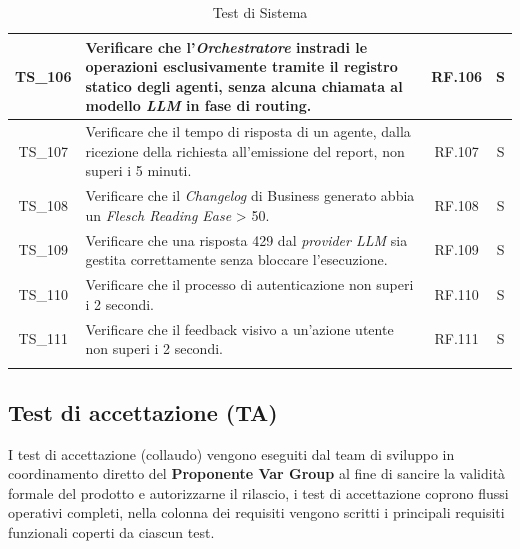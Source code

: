\documentclass[12pt, a4paper]{article}
\newlength{\LargColVal} %
\begin{document}
\begin{xltabular}{\textwidth}{|c|X|C{\LargColVal}|C{\LargColVal}|}
    TS\_106 & Verificare che l'\textit{Orchestratore} instradi le operazioni esclusivamente tramite il registro statico degli agenti, senza alcuna chiamata al modello \textit{LLM} in fase di routing. & RF.106 & S \\ \hline
    TS\_107 & Verificare che il tempo di risposta di un agente, dalla ricezione della richiesta all'emissione del report, non superi i 5 minuti. & RF.107 & S \\ \hline
    TS\_108 & Verificare che il \textit{Changelog} di Business generato abbia un \textit{Flesch Reading Ease} > 50. & RF.108 & S \\ \hline
    TS\_109 & Verificare che una risposta 429 dal \textit{provider LLM} sia gestita correttamente senza bloccare l'esecuzione. & RF.109 & S \\ \hline
    TS\_110 & Verificare che il processo di autenticazione non superi i 2 secondi. & RF.110 & S \\ \hline
    TS\_111 & Verificare che il feedback visivo a un'azione utente non superi i 2 secondi. & RF.111 & S \\ \hline

    \caption{Test di Sistema}
    \label{tab:test_sistema}
\end{xltabular}

\subsection{Test di accettazione (TA)}
I test di accettazione (collaudo) vengono eseguiti dal team di sviluppo in coordinamento diretto del \textbf{Proponente Var Group} al fine di sancire la validità formale del prodotto e autorizzarne il rilascio, i test di accettazione coprono flussi operativi completi, nella colonna dei requisiti vengono scritti i principali requisiti funzionali coperti da ciascun test.
\end{document}
